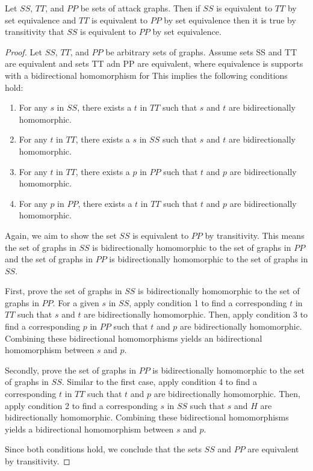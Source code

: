 \documentclass[runningheads]{llncs}
\theoremstyle{definition}
\newcommand{\squash}{\itemsep=0pt\parskip=0pt}
\begin{document}
\begin{theorem}
    Let $SS$, $TT$, and $PP$ be sets of attack graphs. Then if $SS$ is equivalent to $TT$ by set equivalence and $TT$ is equivalent to $PP$ by set equivalence then it is true by transitivity that $SS$ is equivalent to $PP$ by set equivalence.   
\end{theorem}

\begin{proof}
Let $SS$, $TT$, and $PP$ be arbitrary sets of graphs. Assume sets SS and TT are equivalent and sets TT adn PP are equivalent, where equivalence is supports with a bidirectional homomorphism for This implies the following conditions hold:
\begin{enumerate}
    \squash
    \item For any $s$ in $SS$, there exists a $t$ in $TT$ such that $s$ and $t$ are bidirectionally homomorphic.
    \item For any $t$ in $TT$, there exists a $s$ in $SS$ such that $s$ and $t$ are bidirectionally homomorphic.
    \item For any $t$ in $TT$, there exists a $p$ in $PP$ such that $t$ and $p$ are bidirectionally homomorphic.
    \item For any $p$ in $PP$, there exists a $t$ in $TT$ such that $t$ and $p$ are bidirectionally homomorphic.
\end{enumerate}

Again, we aim to show the set $SS$ is equivalent to $PP$ by transitivity. This means the set of graphs in $SS$ is bidirectionally homomorphic to the set of graphs in $PP$ and the set of graphs in $PP$ is bidirectionally homomorphic to the set of graphs in $SS$. 

First, prove the set of graphs in $SS$ is bidirectionally homomorphic to the set of graphs in $PP$. For a given $s$ in $SS$, apply condition 1 to find a corresponding $t$ in $TT$ such that $s$ and $t$ are bidirectionally homomorphic. Then, apply condition 3 to find a corresponding $p$ in $PP$ such that $t$ and $p$ are bidirectionally homomorphic. Combining these bidirectional homomorphisms yields an bidirectional homomorphism between $s$ and $p$.

Secondly, prove the set of graphs in $PP$ is bidirectionally homomorphic to the set of graphs in $SS$. Similar to the first case, apply condition 4 to find a corresponding $t$ in $TT$ such that $t$ and $p$ are bidirectionally homomorphic. Then, apply condition 2 to find a corresponding $s$ in $SS$ such that $s$ and $H$ are bidirectionally homomorphic. Combining these bidirectional homomorphisms yields a bidirectional homomorphism between $s$ and $p$.

Since both conditions hold, we conclude that the sets $SS$ and $PP$ are equivalent by transitivity.
\end{proof}
\end{document}
